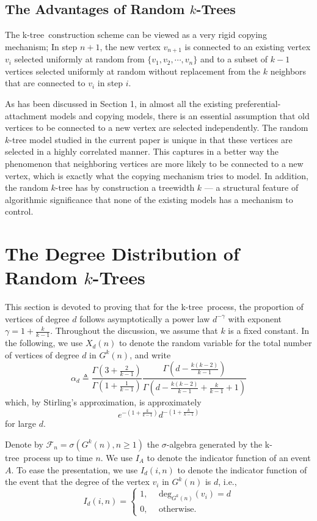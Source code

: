 \documentclass[11pt]{article}
\providecommand{\degree}[2]{{\textrm{deg}_{#1}(#2)}}
\providecommand{\rktree}[2]{G^{#1}(#2)}
\providecommand{\tdeg}[2]{X_{#1}(#2)}
\providecommand{\ktree}{k-tree}
\begin{document}
\subsection{The Advantages of Random $k$-Trees}
The \ktree\ construction scheme can be viewed as a very rigid copying mechanism; In step $n + 1$, the new vertex $v_{n + 1}$
is connected to an existing vertex $v_i$ selected uniformly at random from $\{v_1, v_2, \cdots, v_n\}$ and to a subset of $k - 1$ vertices selected uniformly at random
without replacement from the $k$ neighbors that are connected to $v_i $ in step $i$.

As has been discussed in Section 1, in almost all the existing  preferential-attachment models
and copying models, there is an essential assumption that old vertices to be connected to 
a new vertex are selected independently. The random $k$-tree model studied in the current paper
is unique in that  these vertices are selected in a highly correlated manner. This
captures in a better way the phenomenon that neighboring vertices are more likely to be 
connected to a new vertex, which is exactly what the copying mechanism tries to model.  
In addition, the random $k$-tree has by construction a treewidth $k$ --- a structural
feature of algorithmic significance that none of the existing models  
has a mechanism to control.  
       






\section{The Degree Distribution of Random $k$-Trees}
This section is devoted to proving that for the \ktree\ process, the proportion of vertices of degree $d$ follows asymptotically
a power law $d^{-\gamma}$ with  exponent $\gamma = 1 + \frac{k}{k - 1}$.  Throughout the discussion, we assume that
$k$ is a fixed constant. 
In the following, we use $\tdeg{d}{n}$ to denote the random variable for the total number
of vertices of degree $d$ in $\rktree{k}{n}$, and write    
$$
\alpha_{d} \triangleq
      \frac{\Gamma(3 + \frac{2}{k - 1})}{\Gamma(1 + \frac{1}{k - 1})} \frac{\Gamma(d - \frac{k(k-2)}{k-1})}{\Gamma(d - \frac{k(k-2)}{k-1} + \frac{k}{k-1} + 1)}
$$
which, by Stirling's approximation, is approximately
$$
e^{-(1 + \frac{k}{k-1})}d^{-(1 + \frac{k}{k-1})}
$$
for large $d$.

Denote by $\mathcal{F}_n = \sigma(\rktree{k}{n}, n \geq 1)$
the $\sigma$-algebra generated by the \ktree\ process up to time $n$. 
We use $I_{A}$ to denote the indicator function of an event $A$. To ease the presentation, we 
use $I_d(i, n)$ to denote the indicator function of the event that the degree of the vertex 
$v_i$ in $\rktree{k}{n}$ is $d$, i.e.,
$$
I_d(i, n) = \left \{
\begin{array}{ll}
1, & \ \ \degree{\rktree{k}{n}}{v_i} = d \\
0, & \ \ \textrm{otherwise.}
\end{array}
\right.
$$
\end{document}
